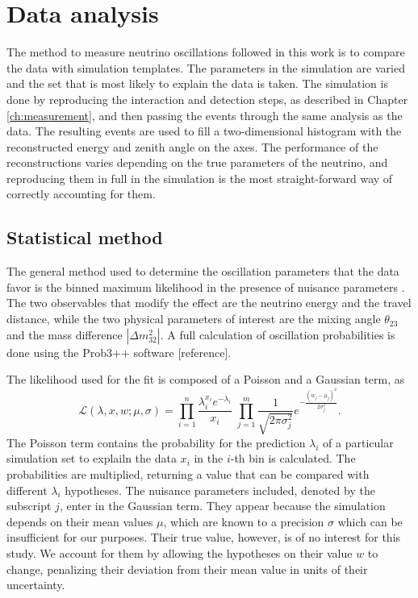 \documentclass[../Main.tex]{subfiles}
\begin{document}
       {}       {}
    {}    {}
 {} {}


\graphicspath{{figures/}{DataAnalysis/figures/}}


\section{Data analysis}

The method to measure neutrino oscillations followed in this work is to compare the data with simulation templates. The parameters in the simulation are varied and the set that is most likely to explain the data is taken. The simulation is done by reproducing the interaction and detection steps, as described in Chapter \ref{ch:measurement}, and then passing the events through the same analysis as the data. The resulting events are used to fill a two-dimensional histogram with the reconstructed energy and zenith angle on the axes. The performance of the reconstructions varies depending on the true parameters of the neutrino, and reproducing them in full in the simulation is the most straight-forward way of correctly accounting for them.

\subsection{Statistical method}
The general method used to determine the oscillation parameters that the data favor is the binned maximum likelihood in the presence of nuisance parameters \cite{llh}. The two observables that modify the effect are the neutrino energy and the travel distance, while the two physical parameters of interest are the mixing angle $\theta_{23}$ and the mass difference $|\Delta m_{32}^2|$. A full calculation of oscillation probabilities is done using the Prob3++ software [reference].

The likelihood used for the fit is composed of a Poisson and a Gaussian term, as
\begin{equation}
\mathcal{L}(\lambda, x, w ; \mu, \sigma) = \prod_{i=1}^n \frac{\lambda_i^{x_i}e^{-\lambda_i}}{x_i\!}\;\prod_{j=1}^m \frac{1}{\sqrt{2 \pi \sigma^2_j}} e^{-\frac{(w_j - \mu_j)^2}{2\sigma^2_j}}.
\label{eq:PoissonLikelihood}
\end{equation} 
The Poisson term contains the probability for the prediction $\lambda_i$ of a particular simulation set to explailn the data $x_i$ in the $i$-th bin is calculated. The probabilities are multiplied, returning a value that can be compared with different $\lambda_i$ hypotheses. The nuisance parameters included, denoted by the subscript $j$, enter in the Gaussian term. They appear because the simulation depends on their mean values $\mu$, which are known to a precision $\sigma$ which can be insufficient for our purposes. Their true value, however, is of no interest for this study. We account for them by allowing the hypotheses on their value $w$ to change, penalizing their deviation from their mean value in units of their uncertainty.
\end{document}
